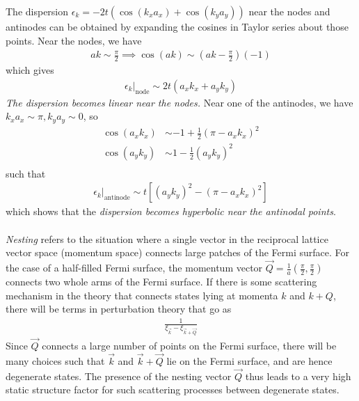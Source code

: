 \documentclass[12pt]{article}
\numberwithin{equation}{section}
\begin{document}
The dispersion \(\epsilon_k = -2t\left(\cos(k_x a_x) + \cos(k_y a_y)\right)\) near the nodes and antinodes can be obtained by expanding the cosines in Taylor series about those points. Near the nodes, we have
\begin{equation}\begin{aligned}
	ak \sim \frac{\pi}{2} \implies \cos(ak) \sim \left(ak - \frac{\pi}{2}\right)(-1)
\end{aligned}\end{equation}
which gives
\begin{equation}\begin{aligned}
	\epsilon_k \vert_\text{node} \sim 2t \left(a_x k_x + a_y k_y\right)
\end{aligned}\end{equation}
\textit{The dispersion becomes linear near the nodes.} Near one of the antinodes, we have \(k_x a_x \sim \pi, k_y a_y \sim 0\), so
\begin{equation}\begin{aligned}
	\cos (a_x k_x) &\sim -1 + \frac{1}{2}\left( \pi - a_x k_x \right)^2\\
	\cos (a_y k_y) &\sim 1 - \frac{1}{2}\left(a_y k_y \right)^2\\
\end{aligned}\end{equation}
such that
\begin{equation}\begin{aligned}
	\epsilon_k \vert_\text{antinode} \sim t \left[\left(a_y k_y \right)^2 - \left( \pi - a_x k_x \right)^2\right]
\end{aligned}\end{equation}
which shows that the \textit{dispersion becomes hyperbolic near the antinodal points}.
\\\\
\textit{Nesting} refers to the situation where a single vector in the reciprocal lattice vector space (momentum space) connects large patches of the Fermi surface. For the case of a half-filled Fermi surface, the momentum vector \(\vec Q = \frac{1}{a}\left( \frac{\pi}{2}, \frac{\pi}{2}\right)\) connects two whole arms of the Fermi surface. If there is some scattering mechanism in the theory that connects states lying at momenta \(k\) and \(k+Q\), there will be terms in perturbation theory that go as
\begin{equation}\begin{aligned}
	\frac{1}{\xi_{\vec k} - \xi_{\vec k + \vec Q}}
\end{aligned}\end{equation}
Since \(\vec Q\) connects a large number of points on the Fermi surface, there will be many choices such that \(\vec k\) and \(\vec k + \vec Q\) lie on the Fermi surface, and are hence degenerate states. The presence of the nesting vector \(\vec Q\) thus leads to a very high static structure factor for such scattering processes between degenerate states.









\end{document}
